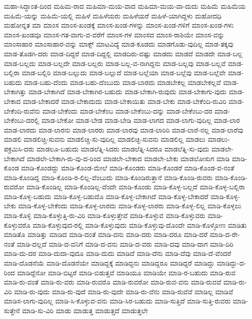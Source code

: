 {ಮಹಾ-ಸಿದ್ಧಾಂತ-ದಿಂದ
ಮಹಿಮ-ರಾದ
ಮಹಿಮಾ-ಮಯ-ವಾದ
ಮಹಿಮಾ-ಮಯ-ವಾ-ದುದು
ಮಹಿಮೆ
ಮಹಿಮೆಯ
ಮಹಿಮೆ-ಯನ್ನು
ಮಹಿಮೆ-ಯಲ್ಲಿ
ಮಹಿಳೆ
ಮಹಿಳೆಯರು
ಮಹಿಳೆಯರೆ
ಮಹಿಳೆ-ಯಾಗಿದ್ದಳು
ಮಹೋದಧಿ
ಮಹೋನ್ನತ
ಮಾ
ಮಾಂಸ
ಮಾಂಸ-ಖಂಡಕ್ಕೆ
ಮಾಂಸ-ಖಂಡ-ಗಳನ್ನು
ಮಾಂಸ-ಖಂಡ-ಗಳಿಗೆ
ಮಾಂಸ-ಖಂಡ-ಗಳು
ಮಾಂಸ-ಖಂಡವೂ
ಮಾಂಸ-ಗತ-ವಾಗು-ವ-ವರೆಗೆ
ಮಾಂಸ-ಗಳ
ಮಾಂಸದ
ಮಾಂಸ-ರಾಶಿಯೇ
ಮಾಂಸ-ವನ್ನು
ಮಾಂಸಾಹಾರ
ಮಾಂಸಾಹಾರ-ವನ್ನು
ಮಾಕ್ಸ್
ಮಾಟವಿದ್ಯೆ
ಮಾಡ-ಕೂಡದು
ಮಾಡಗೊಡು-ವುದಿಲ್ಲ
ಮಾಡ-ತಕ್ಕವು
ಮಾಡ-ತೊಡಗಿ-ದರು
ಮಾಡ-ದಿದ್ದರೆ
ಮಾಡ-ದಿದ್ದಲ್ಲಿ
ಮಾಡದಿರು-ವಷ್ಟು
ಮಾಡದು
ಮಾಡದೆ
ಮಾಡದೇ
ಮಾಡ-ಬಲ್ಲ
ಮಾಡ-ಬಲ್ಲದು
ಮಾಡ-ಬಲ್ಲದೇ
ಮಾಡ-ಬಲ್ಲರು
ಮಾಡ-ಬಲ್ಲ-ವ-ನಾಗಿದ್ದನು
ಮಾಡ-ಬಲ್ಲವು
ಮಾಡ-ಬಲ್ಲವೆ
ಮಾಡ-ಬಲ್ಲಿರಾ
ಮಾಡ-ಬಲ್ಲಿರಿ
ಮಾಡ-ಬಲ್ಲುದು
ಮಾಡ-ಬಲ್ಲುದೆ
ಮಾಡ-ಬಲ್ಲೆಯಾ
ಮಾಡ-ಬಲ್ಲೆವು
ಮಾಡ-ಬಲ್ಲೆವೇ
ಮಾಡ-ಬಹುದು
ಮಾಡ-ಬಹು-ದೆಂದು
ಮಾಡ-ಬಹು-ದೆಂಬುದು
ಮಾಡ-ಬಾರದು
ಮಾಡಬೇಕಲ್ಲ
ಮಾಡಬೇಕಲ್ಲವೆ
ಮಾಡ-ಬೇಕಾಗಿತ್ತು
ಮಾಡ-ಬೇಕಾಗಿದೆ
ಮಾಡ-ಬೇಕಾಗಿರ-ಬಹುದು
ಮಾಡ-ಬೇಕಾಗಿ-ರುವುದು
ಮಾಡ-ಬೇಕಾಗು-ವುದು
ಮಾಡ-ಬೇಕಾದ
ಮಾಡ-ಬೇಕಾದರೆ
ಮಾಡ-ಬೇಕಾದುದು
ಮಾಡ-ಬೇಕಾಯಿತು
ಮಾಡ-ಬೇಕು
ಮಾಡ-ಬೇಕೆಂದಿ-ರುವಿರಿ
ಮಾಡ-ಬೇಕೆಂದಿ-ರುವೆನು
ಮಾಡ-ಬೇಕೆಂದು
ಮಾಡ-ಬೇಕೆಂಬ
ಮಾಡ-ಬೇಕೆಂಬು-ದನ್ನು
ಮಾಡ-ಬೇಕೆಂಬು-ದರ
ಮಾಡ-ಬೇಕೆಂಬು-ದರಲ್ಲಿ
ಮಾಡ-ಬೇಕೋ
ಮಾಡ-ಬೇಡ
ಮಾಡ-ಬೇಡಿ
ಮಾಡ-ಲಾಗದ
ಮಾಡ-ಲಾಗು-ವುದಿಲ್ಲ
ಮಾಡ-ಲಾರ
ಮಾಡ-ಲಾರದು
ಮಾಡ-ಲಾರನು
ಮಾಡ-ಲಾರರು
ಮಾಡ-ಲಾರವು
ಮಾಡ-ಲಾರಿರಿ
ಮಾಡ-ಲಾರೆ-ನಲ್ಲ
ಮಾಡ-ಲಾರೆವು
ಮಾಡಲಿ
ಮಾಡಲಿಚ್ಚಿ-ಸುವನು
ಮಾಡಲಿಚ್ಚಿ-ಸು-ವುದಿಲ್ಲ
ಮಾಡಲಿಚ್ಛಿ-ಸುವನು
ಮಾಡಲಿಲ್ಲ
ಮಾಡಲು
ಮಾಡಲು-ಪಕ್ರಮಿಸಿ-ದರು
ಮಾಡಲೂ-ಬಹುದು
ಮಾಡಲೆತ್ನಿ-ಸಿದರು
ಮಾಡಲೆತ್ನಿ-ಸಿದರೂ
ಮಾಡಲೆತ್ನಿ-ಸು-ವುದು
ಮಾಡಲೇ-ಬೇಕಾಗಿದೆ
ಮಾಡಲೇ-ಬೇಕಾಗಿ-ರು-ವು-ದ-ರಿಂದ
ಮಾಡಲೇ-ಬೇಕಾದ
ಮಾಡಲೇ-ಬೇಕು
ಮಾಡಲೋಸುಗ
ಮಾಡಿ
ಮಾಡಿ-ಕೊಂಡ
ಮಾಡಿ-ಕೊಂಡದ್ದು
ಮಾಡಿ-ಕೊಂಡ-ಮೇಲೆ
ಮಾಡಿ-ಕೊಂಡರು
ಮಾಡಿ-ಕೊಂಡರೆ
ಮಾಡಿ-ಕೊಂಡ-ವ-ನಂತೆ
ಮಾಡಿ-ಕೊಂಡಿದ್ದ
ಮಾಡಿ-ಕೊಂಡಿ-ರ-ಲಿಲ್ಲ-ವೆಂಬುದು
ಮಾಡಿ-ಕೊಂಡಿರುತ್ತಾನೆ
ಮಾಡಿ-ಕೊಂಡಿ-ರುವರು
ಮಾಡಿ-ಕೊಂಡಿ-ರುವರೋ
ಮಾಡಿ-ಕೊಂಡಿಲ್ಲ
ಮಾಡಿ-ಕೊಂಡಿಲ್ಲ-ವೆಂದೇ
ಮಾಡಿ-ಕೊಂಡು
ಮಾಡಿ-ಕೊಳ್ಳ-ಬಲ್ಲದೆ
ಮಾಡಿ-ಕೊಳ್ಳ-ಬಲ್ಲಿರಾ
ಮಾಡಿ-ಕೊಳ್ಳ-ಬಹುದು
ಮಾಡಿ-ಕೊಳ್ಳ-ಬಹುದೊ
ಮಾಡಿ-ಕೊಳ್ಳ-ಬೇಕಾಗಿದೆ
ಮಾಡಿ-ಕೊಳ್ಳ-ಬೇಕಾದರೆ
ಮಾಡಿ-ಕೊಳ್ಳ-ಬೇಕು
ಮಾಡಿ-ಕೊಳ್ಳ-ಬೇಕೆಂದು
ಮಾಡಿ-ಕೊಳ್ಳ-ಲಾರದು
ಮಾಡಿ-ಕೊಳ್ಳ-ಲಾರರು
ಮಾಡಿ-ಕೊಳ್ಳ-ಲಿಲ್ಲ
ಮಾಡಿ-ಕೊಳ್ಳಲು
ಮಾಡಿ-ಕೊಳ್ಳಿ
ಮಾಡಿ-ಕೊಳ್ಳುತ್ತಿ-ರು-ವಿರಿ
ಮಾಡಿ-ಕೊಳ್ಳುತ್ತೇವೆ
ಮಾಡಿ-ಕೊಳ್ಳುವ
ಮಾಡಿ-ಕೊಳ್ಳುವರು
ಮಾಡಿ-ಕೊಳ್ಳುವರೊ
ಮಾಡಿ-ಕೊಳ್ಳುವುದ-ರಲ್ಲಿ
ಮಾಡಿ-ಕೊಳ್ಳುವುದು
ಮಾಡಿ-ಕೊಳ್ಳುವು-ದೊಂದೇ
ಮಾಡಿ-ಕೊಳ್ಳೋಣ
ಮಾಡಿತು
ಮಾಡಿತೊ
ಮಾಡಿತ್ತು
ಮಾಡಿದ
ಮಾಡಿ-ದಂತೆ
ಮಾಡಿ-ದನು
ಮಾಡಿ-ದರು
ಮಾಡಿ-ದರೂ
ಮಾಡಿ-ದರೆ
ಮಾಡಿ-ದ-ರೇ-ನಂತೆ
ಮಾಡಿ-ದಲ್ಲದೆ
ಮಾಡಿ-ದ-ವನಿಗೆ
ಮಾಡಿ-ದ-ವನು
ಮಾಡಿ-ದ-ವರು
ಮಾಡಿ-ದವು
ಮಾಡಿ-ದಾಗ
ಮಾಡಿ-ದಿರಿ
ಮಾಡಿ-ದು-ದರ
ಮಾಡಿ-ದುದಾ-ವುದೂ
ಮಾಡಿ-ದುದು
ಮಾಡಿದೆ
ಮಾಡಿ-ದೆನು
ಮಾಡಿ-ದೆವು
ಮಾಡಿ-ದೆ-ವೆಂದರೆ
ಮಾಡಿ-ದೊಡನೆಯೆ
ಮಾಡಿ-ದೊಡನೆಯೇ
ಮಾಡಿದ್ದಕ್ಕೆ
ಮಾಡಿದ್ದನು
ಮಾಡಿದ್ದರೂ
ಮಾಡಿದ್ದರೆ
ಮಾಡಿದ್ದು
ಮಾಡಿದ್ದು-ದ-ರಿಂದ
ಮಾಡಿದ್ದೆನೋ
ಮಾಡಿ-ಬಿಟ್ಟರೆ
ಮಾಡಿ-ಬಿಡುತ್ತವೆ
ಮಾಡಿಯೂ
ಮಾಡಿಯೇ
ಮಾಡಿ-ರ-ಬಹುದು
ಮಾಡಿ-ರುವ
ಮಾಡಿ-ರು-ವಂತೆ
ಮಾಡಿ-ರು-ವರು
ಮಾಡಿ-ರುವರೊ
ಮಾಡಿ-ರುವರೋ
ಮಾಡಿ-ರುವ-ವನು
ಮಾಡಿ-ರುವವೆ
ಮಾಡಿ-ರು-ವಿರಿ
ಮಾಡಿ-ರು-ವುದು
ಮಾಡಿ-ರು-ವುದೆ
ಮಾಡಿ-ರು-ವುದೇ
ಮಾಡಿ-ರು-ವೆನು
ಮಾಡಿ-ರುವೆವೆ
ಮಾಡಿಲ್ಲ
ಮಾಡಿವೆ
ಮಾಡಿಸ-ಲಾಗು-ವುದಿಲ್ಲ
ಮಾಡಿ-ಸಿ-ಕೊಳ್ಳುವ-ವನು
ಮಾಡಿ-ಸಿರ-ಬಹುದು
ಮಾಡಿ-ಸುತ್ತಿದೆ
ಮಾಡಿ-ಸುತ್ತಿ-ರುವರು
ಮಾಡಿ-ಸುತ್ತೇನೆ
ಮಾಡಿ-ಸು-ವಿರಿ
ಮಾಡು
ಮಾಡುತ್ತ
ಮಾಡುತ್ತದೆ
ಮಾಡುತ್ತಲೇ
}

